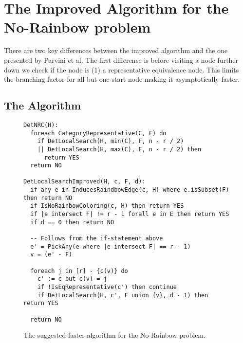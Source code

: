 \documentclass{book}
\theoremstyle{definition}
\begin{document}
% 
% 
% 

\chapter{The Improved Algorithm for the No-Rainbow problem}
There are two key differences between the improved algorithm and the one presented by Parvini et al. The first difference is before visiting a node further down we check if the node is (1) a representative equivalence node. This limits the branching factor for all but one start node making it asymptotically faster.

\section{The Algorithm}
\begin{figure}
\begin{verbatim}
DetNRC(H):
  foreach CategoryRepresentative(C, F) do
    if DetLocalSearch(H, min(C), F, n - r / 2)
    || DetLocalSearch(H, max(C), F, n - r / 2) then
      return YES
  return NO

DetLocalSearchImproved(H, c, F, d):
  if any e in InducesRaindbowEdge(c, H) where e.isSubset(F) then return NO
  if IsNoRainbowColoring(c, H) then return YES
  if |e intersect F| != r - 1 forall e in E then return YES
  if d == 0 then return NO

  -- Follows from the if-statement above
  e' = PickAny(e where |e intersect F| == r - 1)
  v = (e' - F)

  foreach j in [r] - {c(v)} do
    c' := c but c(v) = j
    if !IsEqRepresentative(c') then continue
    if DetLocalSearch(H, c', F union {v}, d - 1) then return YES

  return NO
\end{verbatim}
\label{alg:nrc++}
\caption{The suggested faster algorithm for the No-Rainbow problem.}

\end{figure}
\end{document}

